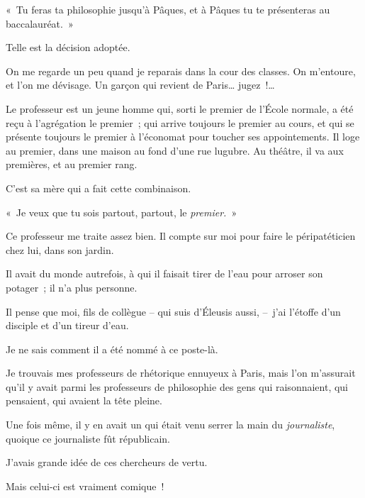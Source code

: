 \documentclass[french,twoside]{book} %
\def\mednobreak{\ifdim\lastskip<\medskipamount
  \removelastskip\nopagebreak\medskip\fi}
\newcommand{\labelblock}[1]{\medbreak{\noindent\color{rubric}\bfseries #1}\par\mednobreak}
\begin{document}
\noindent « Tu feras ta philosophie jusqu’à Pâques, et à Pâques tu te présenteras au baccalauréat. »\par
Telle est la décision adoptée.\par
On me regarde un peu quand je reparais dans la cour des classes. On m’entoure, et l’on me dévisage. Un garçon qui revient de Paris… jugez !…\par
\bigbreak
\noindent Le professeur est un jeune homme qui, sorti le premier de l’École normale, a été reçu à l’agrégation le premier ; qui arrive toujours le premier au cours, et qui se présente toujours le premier à l’économat pour toucher ses appointements. Il loge au premier, dans une maison au fond d’une rue lugubre. Au théâtre, il va aux premières, et au premier rang.\par
C’est sa mère qui a fait cette combinaison.\par
« Je veux que tu sois partout, partout, le \emph{premier.} »\par
\bigbreak
\noindent Ce professeur me traite assez bien. Il compte sur moi pour faire le péripatéticien chez lui, dans son jardin.\par
Il avait du monde autrefois, à qui il faisait tirer de l’eau pour arroser son potager ; il n’a plus personne.\par
Il pense que moi, fils de collègue – qui suis d’Éleusis aussi, – j’ai l’étoffe d’un disciple et d’un tireur d’eau.\par
Je ne sais comment il a été nommé à ce poste-là.\par
Je trouvais mes professeurs de rhétorique ennuyeux à Paris, mais l’on m’assurait qu’il y avait parmi les professeurs de philosophie des gens qui raisonnaient, qui pensaient, qui avaient la tête pleine.\par
Une fois même, il y en avait un qui était venu serrer la main du \emph{journaliste}, quoique ce journaliste fût républicain.\par
J’avais grande idée de ces chercheurs de vertu.\par
Mais celui-ci est vraiment comique !\par

\labelblock{EN CLASSE}
\end{document}
